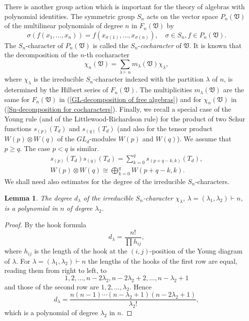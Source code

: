 \documentclass{amsart}[12pt]
\newtheorem{lemma}[theorem]{Lemma}
\theoremstyle{definition}
\begin{document}
There is another group action which is important for the theory of algebras with polynomial identities.
The symmetric group $S_n$ acts on the vector space $P_n({\mathfrak V})$ of the multilinear polynomials of degree $n$ in $F_n({\mathfrak V})$ by
\[
\sigma(f(x_1,\ldots,x_n))=f(x_{\sigma(1)},\ldots,x_{\sigma(n)}),\quad \sigma\in S_n,f\in P_n({\mathfrak V}).
\]
The $S_n$-character of $P_n({\mathfrak V})$ is called the $S_n$-{\it cocharacter} of $\mathfrak V$.
It is known that the decomposition of the $n$-th cocharacter
\begin{equation}\label{Sn-decomposition for cocharacters}
\chi_n({\mathfrak V})=\sum_{\lambda\vdash n}m_{\lambda}({\mathfrak V})\chi_{\lambda},
\end{equation}
where $\chi_{\lambda}$ is the irreducible $S_n$-character indexed with the partition $\lambda$ of $n$, is determined by the Hilbert series of
$F_n({\mathfrak V})$. The multiplicities $m_{\lambda}({\mathfrak V})$ are the same for $F_n({\mathfrak V})$ in (\ref{GL-decomposition of free algebras})
and for $\chi_n({\mathfrak V})$ in (\ref{Sn-decomposition for cocharacters}).
Finally, we recall a special case of the Young rule (and of the Littlewood-Richardson rule)
for the product of two Schur functions $s_{(p)}(T_d)$ and $s_{(q)}(T_d)$
(and also for the tensor product $W(p)\otimes W(q)$ of the $GL_d$-modules $W(p)$ and $W(q)$). We assume that $p\geq q$. The case $p<q$
is similar.
\begin{equation}\label{Young rule}
\begin{split}
s_{(p)}(T_d)s_{(q)}(T_d)=\sum_{k=0}^qs_{(p+q-k,k)}(T_d),\\
W(p)\otimes W(q)\cong \bigoplus_{k=0}^qW(p+q-k,k).
\end{split}
\end{equation}
We shall need also estimates for the degree of the irreducible $S_n$-characters.

\begin{lemma}\label{degree for Sn-characters}
The degree $d_{\lambda}$ of the irreducible $S_n$-character $\chi_{\lambda}$, $\lambda=(\lambda_1,\lambda_2)\vdash n$,
is a polynomial in $n$ of degree $\lambda_2$.
\end{lemma}

\begin{proof} By the hook formula
\[
d_{\lambda}=\frac{n!}{\prod h_{ij}},
\]
where $h_{ij}$ is the length of the hook at the $(i,j)$-position of the Young diagram of $\lambda$.
For $\lambda=(\lambda_1,\lambda_2)\vdash n$ the lengths of the hooks of the first row are equal, reading them from right to left, to
\[
1,2,\ldots,n-2\lambda_2,n-2\lambda_2+2,\ldots,n-\lambda_2+1
\]
and those of the second row are $1,2,\ldots,\lambda_2$. Hence
\[
d_{\lambda}=\frac{n(n-1)\cdots (n-\lambda_2+1)(n-2\lambda_2+1)}{\lambda_2!},
\]
which is a polynomial of degree $\lambda_2$ in $n$.
\end{proof}
\end{document}
